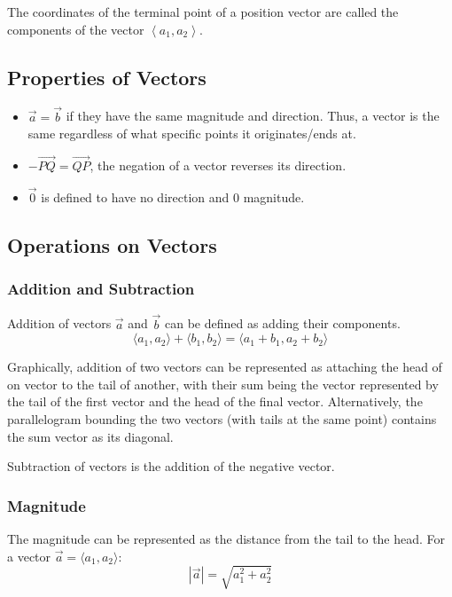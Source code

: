 \documentclass{article}
\begin{document}
The coordinates of the terminal point of a position vector are called the components of the vector $\left\langle a_1, a_2 \right\rangle$.

\subsection{Properties of Vectors}
\begin{itemize}
    \item $\Vec{a}=\Vec{b}$ if they have the same magnitude and direction. Thus, a vector is the same regardless of what specific points it originates/ends at.
    \item $-\overrightarrow{PQ} = \overrightarrow{QP}$, the negation of a vector reverses its direction.
    \item $\overrightarrow{0}$ is defined to have no direction and $0$ magnitude.
\end{itemize}

\subsection{Operations on Vectors}
\subsubsection{Addition and Subtraction}
Addition of vectors $\overrightarrow{a}$ and $\overrightarrow{b}$ can be defined as adding their components.
$$\langle a_1, a_2 \rangle + \langle b_1, b_2 \rangle = \langle a_1 + b_1, a_2 + b_2\rangle$$

Graphically, addition of two vectors can be represented as attaching the head of on vector to the tail of another, with their sum being the vector represented by the tail of the first vector and the head of the final vector. Alternatively, the parallelogram bounding the two vectors (with tails at the same point) contains the sum vector as its diagonal.

Subtraction of vectors is the addition of the negative vector.

\subsubsection{Magnitude}
The magnitude can be represented as the distance from the tail to the head. For a vector $\overrightarrow{a} = \langle a_1, a_2 \rangle$:
$$\left|\overrightarrow{a}\right| = \sqrt{a_1^2+a_2^2}$$
\end{document}
